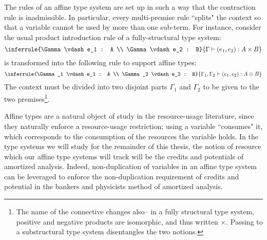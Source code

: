 The rules of an affine type system are set up in such a way that the contraction rule is inadmissible. In particular, every multi-premise rule ``splits" the context so that a variable cannot be used by more than one sub-term. For instance, consider the usual product introduction rule of a fully-structural type system:
$$
\inferrule{\Gamma \vdash e_1 : A \\ \Gamma \vdash e_2 : B}{\Gamma \vdash (e_1,e_2) : A \times B}
$$
is transformed into the following rule to support affine types:
$$
\inferrule{\Gamma_1 \vdash e_1 : A \\ \Gamma_2 \vdash e_2 : B}{\Gamma_1,\Gamma_2 \vdash (e_1,e_2) : A \otimes B}
$$
The context must be divided into two disjoint parts $\Gamma_1$ and $\Gamma_2$ to be given to the two premises\footnote{
The name of the connective changes also-- in a fully structural type system, positive and negative products are isomorphic, and thus written $\times$. Passing to a substructural type system disentangles the two notions.
}.

Affine types are a natural object of study in the resource-usage literature, since they naturally enforce a resource-usage restriction: using a variable ``consumes" it, which corresponds to the consumption of the resources the variable holds. In the type systems we will study for the remainder of this thesis, the notion of resource which our affine type systems will track will be the credits and potentials of amortized analysis. Indeed, non-duplication of variables in an affine type system can be leveraged to enforce the non-duplication requirement of credits and potential in the bankers and physicists method of amortized analysis.

